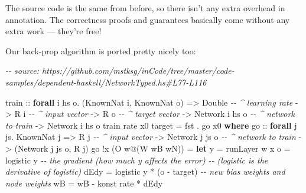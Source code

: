 \documentclass[]{article}
\newenvironment{Shaded}{}{}
\newcommand{\CommentTok}[1]{\textcolor[rgb]{0.38,0.63,0.69}{\textit{#1}}}
\newcommand{\DataTypeTok}[1]{\textcolor[rgb]{0.56,0.13,0.00}{#1}}
\newcommand{\FunctionTok}[1]{\textcolor[rgb]{0.02,0.16,0.49}{#1}}
\newcommand{\KeywordTok}[1]{\textcolor[rgb]{0.00,0.44,0.13}{\textbf{#1}}}
\newcommand{\NormalTok}[1]{#1}
\newcommand{\OperatorTok}[1]{\textcolor[rgb]{0.40,0.40,0.40}{#1}}
\newcommand{\OtherTok}[1]{\textcolor[rgb]{0.00,0.44,0.13}{#1}}
\begin{document}
The source code is the same from before, so there isn't any extra overhead in
annotation. The correctness proofs and guarantees basically come without any
extra work --- they're free!

Our back-prop algorithm is ported pretty nicely too:

\begin{Shaded}
\begin{Highlighting}[]
\CommentTok{{-}{-} source: https://github.com/mstksg/inCode/tree/master/code{-}samples/dependent{-}haskell/NetworkTyped.hs\#L77{-}L116}

\OtherTok{train ::} \KeywordTok{forall}\NormalTok{ i hs o}\OperatorTok{.}\NormalTok{ (}\DataTypeTok{KnownNat}\NormalTok{ i, }\DataTypeTok{KnownNat}\NormalTok{ o)}
      \OtherTok{=\textgreater{}} \DataTypeTok{Double}           \CommentTok{{-}{-} \^{} learning rate}
      \OtherTok{{-}\textgreater{}} \DataTypeTok{R}\NormalTok{ i              }\CommentTok{{-}{-} \^{} input vector}
      \OtherTok{{-}\textgreater{}} \DataTypeTok{R}\NormalTok{ o              }\CommentTok{{-}{-} \^{} target vector}
      \OtherTok{{-}\textgreater{}} \DataTypeTok{Network}\NormalTok{ i hs o   }\CommentTok{{-}{-} \^{} network to train}
      \OtherTok{{-}\textgreater{}} \DataTypeTok{Network}\NormalTok{ i hs o}
\NormalTok{train rate x0 target }\OtherTok{=} \FunctionTok{fst} \OperatorTok{.}\NormalTok{ go x0}
  \KeywordTok{where}
\OtherTok{    go  ::} \KeywordTok{forall}\NormalTok{ j js}\OperatorTok{.} \DataTypeTok{KnownNat}\NormalTok{ j}
        \OtherTok{=\textgreater{}} \DataTypeTok{R}\NormalTok{ j              }\CommentTok{{-}{-} \^{} input vector}
        \OtherTok{{-}\textgreater{}} \DataTypeTok{Network}\NormalTok{ j js o   }\CommentTok{{-}{-} \^{} network to train}
        \OtherTok{{-}\textgreater{}}\NormalTok{ (}\DataTypeTok{Network}\NormalTok{ j js o, }\DataTypeTok{R}\NormalTok{ j)}
\NormalTok{    go }\OperatorTok{!}\NormalTok{x (}\DataTypeTok{O}\NormalTok{ w}\OperatorTok{@}\NormalTok{(}\DataTypeTok{W}\NormalTok{ wB wN))}
        \OtherTok{=} \KeywordTok{let}\NormalTok{ y    }\OtherTok{=}\NormalTok{ runLayer w x}
\NormalTok{              o    }\OtherTok{=}\NormalTok{ logistic y}
              \CommentTok{{-}{-} the gradient (how much y affects the error)}
              \CommentTok{{-}{-}   (logistic\textquotesingle{} is the derivative of logistic)}
\NormalTok{              dEdy }\OtherTok{=}\NormalTok{ logistic\textquotesingle{} y }\OperatorTok{*}\NormalTok{ (o }\OperatorTok{{-}}\NormalTok{ target)}
              \CommentTok{{-}{-} new bias weights and node weights}
\NormalTok{              wB\textquotesingle{}  }\OtherTok{=}\NormalTok{ wB }\OperatorTok{{-}}\NormalTok{ konst rate }\OperatorTok{*}\NormalTok{ dEdy}

\end{Highlighting}
\end{Shaded}
\end{document}
